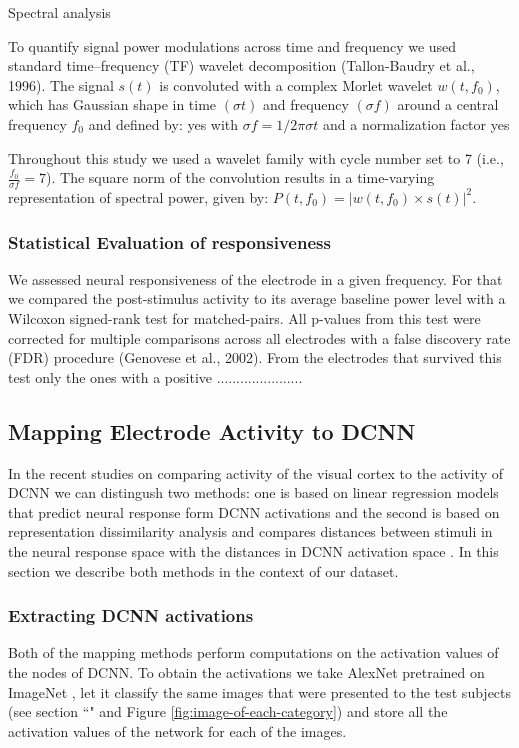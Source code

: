 \documentclass[final]{jneurosci}
\begin{document}
Spectral analysis

To quantify signal power modulations across time and frequency we used standard time–frequency (TF) wavelet decomposition (Tallon-Baudry et al., 1996). The signal $s(t)$ is convoluted with a complex Morlet wavelet $w(t, f_0)$, which has Gaussian shape in time $(\sigma t)$ and frequency $(\sigma f)$ around a central frequency $f_0$ and defined by: yes with $\sigma f = 1/2 \pi \sigma t$ and a normalization factor yes 

Throughout this study we used a wavelet family with cycle number set to 7 (i.e., $\frac{f_0}{\sigma f} = 7$). The square norm of the convolution results in a time-varying representation of spectral power, given by: $P(t, f_0) = |w(t, f_0) × s(t)|^2$.




\subsubsection{Statistical Evaluation of responsiveness}

We assessed neural responsiveness of the electrode in a given frequency. For that we compared the post-stimulus activity to its average baseline power level with a Wilcoxon signed-rank test for matched-pairs. All p-values from this test were corrected for multiple comparisons across all electrodes with a false discovery rate (FDR) procedure (Genovese et al., 2002). From the electrodes that survived this test only the ones with a positive ......................

\subsection{Mapping Electrode Activity to DCNN}
In the recent studies on comparing activity of the visual cortex to the activity of DCNN we can distingush two methods: one is based on linear regression models that predict neural response form DCNN activations \citep{gucclu2015deep} and the second is based on representation dissimilarity analysis \citep{kriegeskorte2008representational} and compares distances between stimuli in the neural response space with the distances in DCNN activation space \citep{cichy2016deep}. In this section we describe both methods in the context of our dataset.

\subsubsection{Extracting DCNN activations}
Both of the mapping methods perform computations on the activation values of the nodes of DCNN. To obtain the activations we take AlexNet \citep{krizhevsky2012imagenet} pretrained on ImageNet \citep{ILSVRC15}, let it classify the same images that were presented to the test subjects (see section ``" and Figure \ref{fig:image-of-each-category}) and store all the activation values of the network for each of the images.
\end{document}
